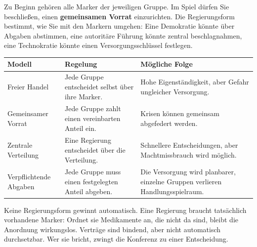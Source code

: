 \clearpage
{}
Zu Beginn gehören alle Marker der jeweiligen Gruppe. Im Spiel dürfen Sie beschließen, einen \textbf{gemeinsamen Vorrat} einzurichten. Die Regierungsform bestimmt, wie Sie mit den Markern umgehen: Eine Demokratie könnte über Abgaben abstimmen, eine autoritäre Führung könnte zentral beschlagnahmen, eine Technokratie könnte einen Versorgungsschlüssel festlegen.\par\medskip

{\renewcommand{\arraystretch}{1.3}\small
\begin{tabular}{|p{3.4cm}|p{6.4cm}|p{\dimexpr\textwidth-9.8cm-6\tabcolsep-4\arrayrulewidth\relax}|}
\hline
\textbf{Modell} & \textbf{Regelung} & \textbf{Mögliche Folge} \\ \hline
Freier Handel & Jede Gruppe entscheidet selbst über ihre Marker. & Hohe Eigenständigkeit, aber Gefahr ungleicher Versorgung. \\ \hline
Gemeinsamer Vorrat & Jede Gruppe zahlt einen vereinbarten Anteil ein. & Krisen können gemeinsam abgefedert werden. \\ \hline
Zentrale Verteilung & Eine Regierung entscheidet über die Verteilung. & Schnellere Entscheidungen, aber Machtmissbrauch wird möglich. \\ \hline
Verpflichtende Abgaben & Jede Gruppe muss einen festgelegten Anteil abgeben. & Die Versorgung wird planbarer, einzelne Gruppen verlieren Handlungsspielraum. \\ \hline
\end{tabular}}

\bigskip
\begin{lkbox}[title={Wichtig},fonttitle=\bfseries]
Keine Regierungsform gewinnt automatisch. Eine Regierung braucht tatsächlich vorhandene Marker: Ordnet sie Medikamente an, die nicht da sind, bleibt die Anordnung wirkungslos. Verträge sind bindend, aber nicht automatisch durchsetzbar. Wer sie bricht, zwingt die Konferenz zu einer Entscheidung.
\end{lkbox}

